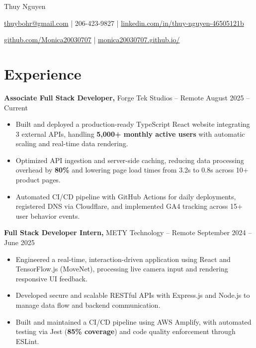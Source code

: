 \documentclass[11pt]{article}
\begin{document}
\centerline{\Huge Thuy Nguyen}

\vspace{5pt}

\centerline{\href{mailto:thuybohr@gmail.com}{thuybohr@gmail.com} | 206-423-9827 |
\href{https://www.linkedin.com/in/thuy-nguyen-46505121b/}{linkedin.com/in/thuy-nguyen-46505121b}}

\centerline{\href{https://github.com/Monica20030707}{github.com/Monica20030707} |
\href{https://monica20030707.github.io/}{monica20030707.github.io/}}

\vspace{-9pt}

\section*{Experience}

\textbf{Associate Full Stack Developer,} {Forge Tek Studios} -- Remote \hfill August 2025 -- Current
\vspace{-9pt}
\begin{itemize}
  \item Built and deployed a production-ready TypeScript React website integrating 3 external APIs, handling \textbf{5,000+ monthly active users} with automatic scaling and real-time data rendering.
  \item Optimized API ingestion and server-side caching, reducing data processing overhead by \textbf{80\%} and lowering page load times from 3.2s to 0.8s across 10+ product pages.
  \item Automated CI/CD pipeline with GitHub Actions for daily deployments, registered DNS via Cloudflare, and implemented GA4 tracking across 15+ user behavior events.
\end{itemize}

\textbf{Full Stack Developer Intern,} {METY Technology} -- Remote \hfill September 2024 -- June 2025
\vspace{-9pt}
\begin{itemize}
  \item Engineered a real-time, interaction-driven application using React and TensorFlow.js (MoveNet), processing live camera input and rendering responsive UI feedback.
  \item Developed secure and scalable RESTful APIs with Express.js and Node.js to manage data flow and backend communication.
  \item Built and maintained a CI/CD pipeline using AWS Amplify, with automated testing via Jest (\textbf{85\% coverage}) and code quality enforcement through ESLint.
\end{itemize}
\end{document}
